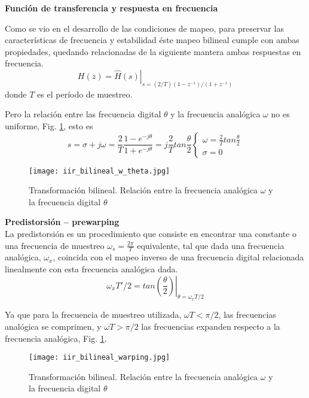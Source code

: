 \documentclass[informe.tex]{subfiles}
\begin{document}
{\textbf{Función de transferencia y respuesta en frecuencia} \newline 	

Como se vio en el desarrollo de las condiciones de mapeo, para preservar las características de frecuencia y estabilidad éste mapeo bilineal cumple con ambas propiedades, quedando relacionadas de la siguiente mantera ambas respuestas en frecuencia.
	$$
		H(z) = \left. \hat{H}(s) \right|_{
											s=(2/T)(1-z^{-1})/(1+z^{-1})
										}
	$$
donde $T$ es el período de muestreo.

Pero la relación entre las frecuencia digital $\theta$ y la frecuencia analógica $\omega$ no es uniforme, Fig. \ref{fig:iir:bilineal:relacion_w_theta_1}, esto es
	$$
		s=\sigma + j \omega
		 = \frac{2}{T} \frac{1-e^{-j \theta}}{1+e^{-j\theta}}
		 = j \frac{2}{T} tan \frac{\theta}{2}
		 \begin{cases} 
		 	\omega = \frac{2}{T} tan \frac{\theta}{2}
		 	\\
		 	\sigma=0		 	
		 \end{cases}
	$$

	\begin{figure}[h!]
	\centering
	\texttt{[image: iir\_bilineal\_w\_theta.jpg]}	
	\caption{Transformación bilineal. Relación entre la frecuencia analógica  $\omega$ y la frecuencia digital $\theta$}
	\label{fig:iir:bilineal:relacion_w_theta_1}
	\end{figure}	

\textbf{Predistorsión – prewarping}\\

La predistorsión es un procedimiento que consiste en encontrar una constante o una frecuencia de muestreo $\omega_s = \frac{2\pi}{T}$ equivalente, tal que dada una frecuencia analógica, $\omega_x$, coincida con el mapeo inverso de una frecuencia digital relacionada linealmente con esta frecuencia analógica dada.\newline
	$$
	     \omega_x T'/2 = \left.  tan \left( \frac{\theta}
	                                      {2} 
	                     \right) \right|_{\theta = \omega_x T/2}
	$$

Ya que para la frecuencia de muestreo utilizada, $\omega T<\pi/2$, las frecuencias analógica se comprimen, y $\omega T>\pi/2$ las frecuencias expanden respecto a la frecuencia analógica, Fig. \ref{fig:iir:bilineal:relacion_w_theta_1}.\newline

	\begin{figure}[h]
		\centering
		\texttt{[image: iir\_bilineal\_warping.jpg]}	
		\caption{Transformación bilineal. Relación entre la frecuencia analógica  $\omega$ y la frecuencia digital $\theta$}
		\label{fig:iir:bilineal:relacion_w_theta_2}
	\end{figure}	
	
}
\end{document}
